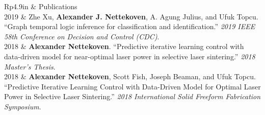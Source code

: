 \documentclass[letterpaper, 11pt]{article}
\newcommand{\headingfont}{\Large\color{CustomBlue}}
\newenvironment{SectionTable}[1]{
	\renewcommand*{\arraystretch}{1.3} %
	\setlength{\tabcolsep}{10pt}
	\begin{longtable}{Rp{4.9in}} & #1 \\}
{\end{longtable}}
\begin{document}
\begin{SectionTable}{\headingfont Publications}
2019 &
Zhe Xu, \textbf{Alexander J. Nettekoven}, A. Agung Julius, and Ufuk Topcu. ``Graph temporal logic inference for classification and identification.'' \textit{2019 IEEE 58th Conference on Decision and Control (CDC)}. \\

2018 &
\textbf{Alexander Nettekoven}. ``Predictive iterative learning control with data-driven model for near-optimal laser power in selective laser sintering.'' \textit{2018 Master's Thesis}. \\

2018 &
\textbf{Alexander Nettekoven}, Scott Fish, Joseph Beaman, and Ufuk Topcu. ``Predictive Iterative Learning Control with Data-Driven Model for Optimal Laser Power in Selective Laser Sintering.'' \textit{2018 International Solid Freeform Fabrication Symposium}.
\end{SectionTable}

\vspace{-0.5cm}


\end{document}
